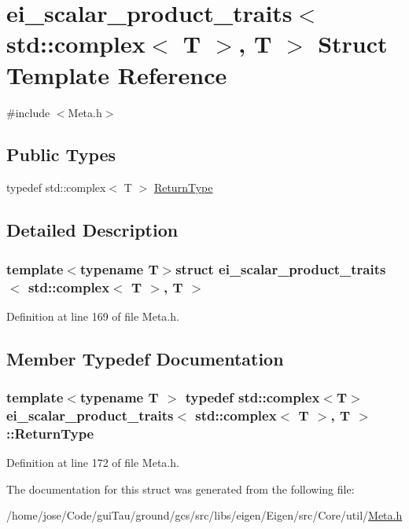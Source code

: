 \hypertarget{structei__scalar__product__traits_3_01std_1_1complex_3_01_t_01_4_00_01_t_01_4}{\section{ei\-\_\-scalar\-\_\-product\-\_\-traits$<$ std\-:\-:complex$<$ T $>$, T $>$ Struct Template Reference}
\label{structei__scalar__product__traits_3_01std_1_1complex_3_01_t_01_4_00_01_t_01_4}
}


{\ttfamily \#include $<$Meta.\-h$>$}

\subsection*{Public Types}
\begin{DoxyCompactItemize}
\item 
typedef std\-::complex$<$ T $>$ \hyperlink{structei__scalar__product__traits_3_01std_1_1complex_3_01_t_01_4_00_01_t_01_4_ac4d977bbbfb4462bfd79a775e44ff5a3}{Return\-Type}
\end{DoxyCompactItemize}


\subsection{Detailed Description}
\subsubsection*{template$<$typename T$>$struct ei\-\_\-scalar\-\_\-product\-\_\-traits$<$ std\-::complex$<$ T $>$, T $>$}



Definition at line 169 of file Meta.\-h.



\subsection{Member Typedef Documentation}
\hypertarget{structei__scalar__product__traits_3_01std_1_1complex_3_01_t_01_4_00_01_t_01_4_ac4d977bbbfb4462bfd79a775e44ff5a3}{
\subsubsection[{Return\-Type}]{\setlength{\rightskip}{0pt plus 5cm}template$<$typename T $>$ typedef std\-::complex$<$T$>$ {\bf ei\-\_\-scalar\-\_\-product\-\_\-traits}$<$ std\-::complex$<$ T $>$, T $>$\-::{\bf Return\-Type}}}\label{structei__scalar__product__traits_3_01std_1_1complex_3_01_t_01_4_00_01_t_01_4_ac4d977bbbfb4462bfd79a775e44ff5a3}


Definition at line 172 of file Meta.\-h.



The documentation for this struct was generated from the following file\-:\begin{DoxyCompactItemize}
\item 
/home/jose/\-Code/gui\-Tau/ground/gcs/src/libs/eigen/\-Eigen/src/\-Core/util/\hyperlink{_meta_8h}{Meta.\-h}\end{DoxyCompactItemize}
